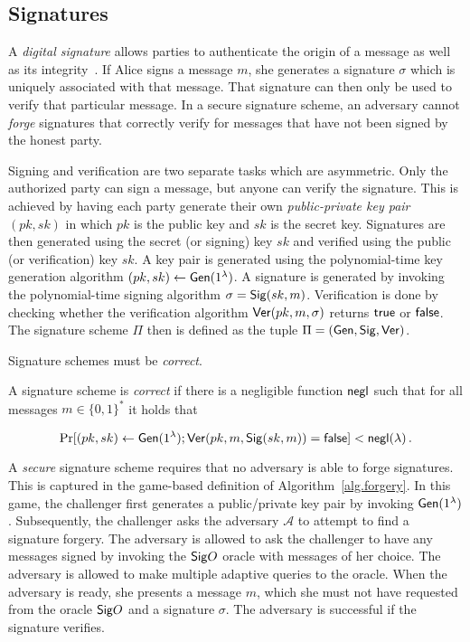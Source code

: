 \subsection{Signatures}
A \emph{digital signature} allows parties to authenticate the origin of a
message as well as its integrity~\cite{katz}. If Alice signs a message $m$, she generates a
signature $\sigma$ which is uniquely associated with that message. That
signature can then only be used to verify that particular message. In a secure signature scheme, an adversary
cannot \emph{forge} signatures that correctly verify for messages that have not
been signed by the honest party.

Signing and verification are two separate tasks which are asymmetric. Only the
authorized party can sign a message, but anyone can verify the signature. This
is achieved by having each party generate their own \emph{public-private
key pair} $(pk, sk)$ in which $pk$ is the public key and $sk$ is the secret key.
Signatures are then generated using the secret (or signing) key $sk$ and
verified using the public (or verification) key $sk$. A key pair is generated
using the polynomial-time key generation algorithm $(pk, sk) \gets
\mathsf{Gen}(1^\lambda)$. A signature is generated by invoking the polynomial-time
signing algorithm $\sigma = \mathsf{Sig}(sk, m)$. Verification is done by checking
whether the verification algorithm $\mathsf{Ver}(pk, m, \sigma)$ returns $\textsf{true}$ or
$\textsf{false}$. The signature scheme $\Pi$ then is defined as the tuple
$\Pi = (\mathsf{Gen}, \mathsf{Sig}, \mathsf{Ver})$.

Signature schemes must be \emph{correct}.

\begin{definition}
  A signature scheme is \emph{correct} if there is a
  negligible function $\mathsf{negl}$ such that for all messages $m \in \{0, 1\}^*$ it
  holds that

  \[
    \Pr[(pk, sk) \gets \mathsf{Gen}(1^\lambda); \mathsf{Ver}(pk, m, \mathsf{Sig}(sk, m)) = \textsf{false}] < \mathsf{negl}(\lambda)\,.
  \]
\end{definition}

A \emph{secure} signature scheme requires that no adversary is able to forge
signatures. This is captured in the game-based definition of Algorithm~\ref{alg.forgery}. In this game, the challenger first generates a public/private key pair by invoking $\mathsf{Gen}(1^\lambda)$. Subsequently, the challenger asks the adversary $\mathcal{A}$ to attempt to find a signature forgery. The adversary is allowed to ask the challenger to have any messages signed by invoking the ${\mathsf{Sig}}O$ oracle with messages of her choice. The adversary is allowed to make multiple adaptive queries to the oracle. When the adversary is ready, she presents a message $m$, which she must not have requested from the oracle ${\mathsf{Sig}}O$ and a signature $\sigma$. The adversary is successful if the signature verifies.

